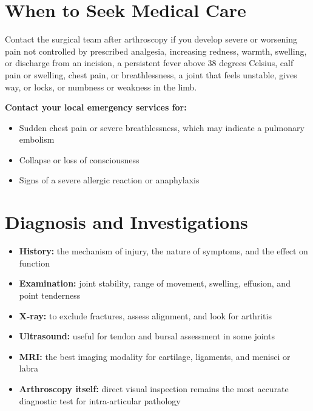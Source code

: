 \section*{When to Seek Medical Care}
Contact the surgical team after arthroscopy if you develop severe or worsening pain not controlled by prescribed analgesia, increasing redness, warmth, swelling, or discharge from an incision, a persistent fever above 38 degrees Celsius, calf pain or swelling, chest pain, or breathlessness, a joint that feels unstable, gives way, or locks, or numbness or weakness in the limb.

\textbf{Contact your local emergency services for:}
\begin{itemize}
    \item Sudden chest pain or severe breathlessness, which may indicate a pulmonary embolism
    \item Collapse or loss of consciousness
    \item Signs of a severe allergic reaction or anaphylaxis
\end{itemize}

\section*{Diagnosis and Investigations}
\begin{itemize}
    \item \textbf{History:} the mechanism of injury, the nature of symptoms, and the effect on function
    \item \textbf{Examination:} joint stability, range of movement, swelling, effusion, and point tenderness
    \item \textbf{X-ray:} to exclude fractures, assess alignment, and look for arthritis
    \item \textbf{Ultrasound:} useful for tendon and bursal assessment in some joints
    \item \textbf{MRI:} the best imaging modality for cartilage, ligaments, and menisci or labra
    \item \textbf{Arthroscopy itself:} direct visual inspection remains the most accurate diagnostic test for intra-articular pathology
\end{itemize}

